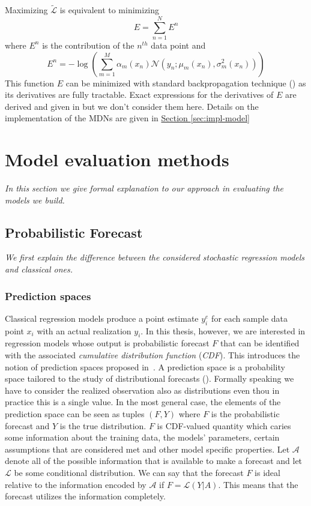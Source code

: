 \documentclass[12pt,a4paper,twoside]{scrartcl}
\numberwithin{equation}{section}
\newcommand{\refsec}[1]{\hyperref[#1]{Section \ref*{#1}}}
\begin{document}
Maximizing \(\tilde{\mathcal{L}}\) is equivalent to minimizing
\begin{equation}
  \label{eq:log-like-sum-1}
  E = \sum_{n=1}^NE^n
\end{equation}
where \(E^n\) is the contribution of the \(n^{th}\) data point and
\begin{equation}
  \label{eq:log-like-sum-2}
  E^n = -\log(\sum_{m=1}^M \alpha_m(x_n)\mathcal{N}(y_n; \mu_m(x_n), \sigma_m^2(x_n)))
\end{equation}
This function \(E\) can be minimized with standard backpropagation technique (\cite{bertels2001}) as its derivatives are fully tractable. Exact expressions for the derivatives of \(E\) are derived and given in \cite{bishop1994} but we don't consider them here. Details on the implementation of the MDNs are given in \refsec{sec:impl-model}
\section{Model evaluation methods}\label{sec:criticism}
\noindent\emph{In this section we give formal explanation to our approach in evaluating the models we build.}
\subsection{Probabilistic Forecast}\label{sec:prob-forecast}
\emph{We first explain the difference between the considered stochastic regression models and classical ones.}
\subsubsection{Prediction spaces}\label{sec:pred-space}
Classical regression models produce a point estimate \(y_i^e\) for each sample data point \(x_i\) with an actual realization \(y_i\). In this thesis, however, we are interested in regression models whose output is probabilistic forecast \(F\) that can be identified with the associated \emph{cumulative distribution function} (\emph{CDF}). This introduces the notion of prediction spaces proposed in~\cite{gneiting2013}. A prediction space is a probability space tailored to the study of distributional forecasts (\cite{gneiting2014}). Formally speaking we have to consider the realized observation also as distributions even thou in practice this is a single value. In the most general case, the elements of the prediction space can be seen as tuples \((F, Y)\) where \(F\) is the probabilistic forecast and \(Y\) is the true distribution. \(F\) is CDF-valued quantity which caries some information about the training data, the models' parameters, certain assumptions that are considered met and other model specific properties. Let \(\mathcal{A}\) denote all of the possible information that is available to make a forecast and let \(\mathcal{L}\) be some conditional distribution. We can say that the forecast \(F\) is ideal relative to the information encoded by \(\mathcal{A}\) if \(F=\mathcal{L}(Y | A)\). This means that the forecast utilizes the information completely. 
\end{document}
